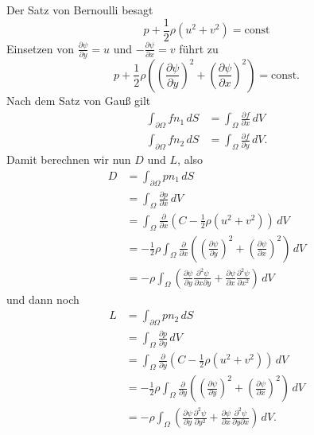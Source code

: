 \documentclass[12pt]{exam}
\newcommand{\del}{\partial}
\begin{document}
\begin{questions}
    \begin{solution}
        Der Satz von Bernoulli besagt
        \begin{equation*}
            p + \frac{1}{2} \rho \left( u^2 + v^2 \right) = \text{const}
        \end{equation*}
        Einsetzen von $\frac{\del \psi}{\del y} = u$ und $-\frac{\del \psi}{\del x} = v$ führt zu
        \begin{equation*}
            p + \frac{1}{2} \rho \left( \left( \frac{\del \psi}{\del y} \right)^2 + \left( \frac{\del \psi}{\del x} \right)^2 \right) = \text{const}.
        \end{equation*}
        Nach dem Satz von Gauß gilt
        \begin{align*}
            \int_{\del \Omega} f n_1 \, dS &= \int_{ \Omega}\frac{\del f}{\del x} \, dV  \\
            \int_{\del \Omega} f n_2 \, dS &= \int_{ \Omega}\frac{\del f}{\del y} \, dV.
        \end{align*}
        Damit berechnen wir nun $D$ und $L$, also
        \begin{align*}
            D &= \int_{\del \Omega} p n_1 \, dS \\
            &= \int_{\Omega} \frac{\del p}{\del x} \, dV \\
            &= \int_{ \Omega} \frac{\del}{\del x} \left( C - \frac{1}{2} \rho \left( u^2 + v^2 \right) \right) \, dV \\
            &= -\frac{1}{2} \rho \int_{\Omega} \frac{\del}{\del x} \left( \left( \frac{\del \psi}{\del y} \right)^2 + \left( \frac{\del \psi}{\del x} \right)^2 \right) \, dV \\
            &= -\rho \int_{\Omega} \left( \frac{\del \psi}{\del y} \frac{\del^2 \psi}{\del x \del y} + \frac{\del \psi}{\del x} \frac{\del^2 \psi}{\del x^2} \right) \, dV
        \end{align*}
        und dann noch
        \begin{align*}
            L &= \int_{\del \Omega} p n_2 \, dS \\
            &= \int_{\Omega} \frac{\del p}{\del y} \, dV \\
            &= \int_{\Omega} \frac{\del}{\del y} \left( C - \frac{1}{2} \rho \left( u^2 + v^2 \right) \right) \, dV \\
            &= -\frac{1}{2} \rho \int_{ \Omega} \frac{\del}{\del y} \left( \left( \frac{\del \psi}{\del y} \right)^{2} + \left( \frac{\del \psi}{\del x} \right)^{2} \right) \, dV \\
            &= -\rho \int_{ \Omega} \left( \frac{\del \psi}{\del y} \frac{\del^2 \psi}{\del y^2} + \frac{\del \psi}{\del x} \frac{\del^2 \psi}{\del y \del x} \right) \, dV.
        \end{align*}
    \end{solution}
    

\end{questions}
\end{document}
